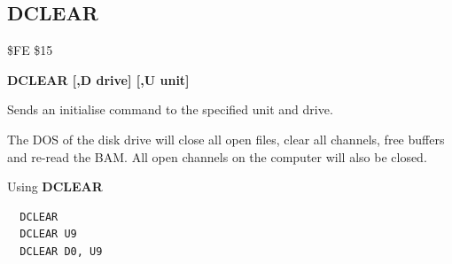
\newpage
\subsection{DCLEAR}
\begin{description}[leftmargin=2cm,style=nextline]
\item [Token:] \$FE \$15
\item [Format:] {\bf DCLEAR [,D drive] [,U unit] }
\item [Usage:]
   Sends an initialise command to the specified unit and drive.

   \drivedefinition

   \unitdefinition

   The DOS of the disk drive will close all open files,
   clear all channels, free buffers and re-read the BAM.
   All open channels on the computer will also be closed.

\item [Examples:] Using {\bf DCLEAR}
\begin{tcolorbox}[colback=black,coltext=white]
\verbatimfont{\codefont}
\begin{verbatim}
  DCLEAR
  DCLEAR U9
  DCLEAR D0, U9
\end{verbatim}
\end{tcolorbox}
\end{description}


\newpage
